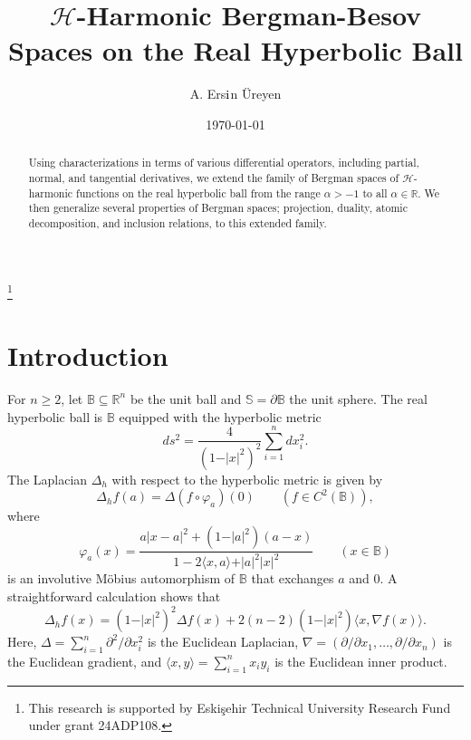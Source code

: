\documentclass{amsart}
\theoremstyle{definition}
\theoremstyle{remark}
\begin{document}
\title{$\mathcal H$-Harmonic Bergman-Besov Spaces on the Real Hyperbolic Ball}

\author{A. Ers$\dot{\hbox{\i}}$n \"Ureyen}

\address{Department of Mathematics, Faculty of Science,
Eski\c{s}ehir Technical University, 26470, Eski\c{s}ehir,
Turkey}

\thanks{This research is supported by Eski\c{s}ehir Technical University
Research Fund under grant 24ADP108.}



\date{\today}


\begin{abstract}
Using characterizations in terms of various differential
operators, including partial, normal, and tangential
derivatives, we extend the family of Bergman spaces of
$\mathcal H$-harmonic functions on the real hyperbolic ball
from the range $\alpha>-1$ to all $\alpha\in\mathbb R$.
We then generalize several properties of Bergman spaces;
projection, duality, atomic decomposition, and inclusion relations,
to this extended family.
\end{abstract}

\maketitle

%
\section{Introduction}
%

For $n\ge 2$, let $\mathbb B\subseteq\mathbb R^n$ be the unit ball and
$\mathbb S=\partial\mathbb B$ the unit sphere.
The real hyperbolic ball is $\mathbb B$ equipped with the hyperbolic metric
\begin{equation*}
ds^2=\frac{4}{(1-\vert x\vert^2)^2}\sum_{i=1}^ndx_i^2.
\end{equation*}
The Laplacian $\Delta_h$ with respect to the hyperbolic metric is given by
\begin{equation*}
\Delta_h f(a)=\Delta (f\circ\varphi_a)(0)
\qquad (f\in C^2(\mathbb B)),
\end{equation*}
where
\begin{equation*}
\varphi_a(x)=\frac{a\vert x-a\vert^2+(1-\vert a\vert^2)(a-x)}
{1-2\langle x,a\rangle+\vert a\vert^2\vert x\vert^2}
\qquad (x\in\mathbb B)
\end{equation*}
is an involutive M\"obius automorphism of $\mathbb B$ that exchanges $a$ and $0$.
A straightforward calculation shows that
\begin{equation*}
\Delta_h f(x)=(1-\vert x\vert^2)^2\Delta f(x)
+2(n-2)(1-\vert x\vert^2)\langle x,\nabla f(x)\rangle.
\end{equation*}
Here, $\Delta=\sum_{i=1}^n \partial^2/\partial x_i^2$ is the Euclidean Laplacian,
$\nabla=(\partial/\partial x_1,\ldots,\partial/\partial x_n)$ is the Euclidean
gradient, and $\langle x,y\rangle=\sum_{i=1}^n x_iy_i$ is the Euclidean inner product.
\end{document}
